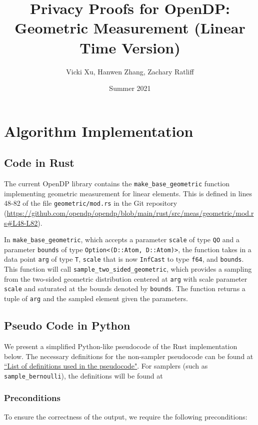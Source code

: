 \documentclass[11pt,a4paper]{article}
\title{Privacy Proofs for OpenDP: Geometric Measurement (Linear Time Version)}
\author{Vicki Xu, Hanwen Zhang, Zachary Ratliff}
\date{Summer 2021}
\newcommand{\vicki}[1]{{ {\color{olive}{(vicki)~#1}}}}
\begin{document}
\maketitle
\tableofcontents

\section{Algorithm Implementation}
\subsection{Code in Rust}
The current OpenDP library contains the \texttt{make\_base\_geometric} function implementing geometric measurement for linear elements. This is defined in lines 48-82 of the file \texttt{geometric/mod.rs} in the Git repository (\url{https://github.com/opendp/opendp/blob/main/rust/src/meas/geometric/mod.rs#L48-L82}).

\vicki{is this right?} 
In \texttt{make\_base\_geometric}, which accepts a parameter \texttt{scale} of type \texttt{QO} and a parameter \texttt{bounds} of type \texttt{Option<(D::Atom, D::Atom)>}, the function takes in a data point \texttt{arg} of type \texttt{T}, \texttt{scale} that is now \texttt{InfCast} to type \texttt{f64}, and \texttt{bounds}. This function will call \texttt{sample\_two\_sided\_geometric}, which provides a sampling from the two-sided geometric distribution centered at \texttt{arg} with scale parameter \texttt{scale} and saturated at the bounds denoted by \texttt{bounds}. The function returns a tuple of \texttt{arg} and the sampled element given the parameters. 

\subsection{Pseudo Code in Python}\label{sec:pseudocode}

We present a simplified Python-like pseudocode of the Rust implementation below. The necessary definitions for the non-sampler pseudocode can be found at \href{https://github.com/opendp/whitepapers/blob/pseudocode-defns/pseudocode-defns/pseudocode_defns.pdf}{``List of definitions used in the pseudocode"}. \vicki{fix link} For samplers (such as \texttt{sample\_bernoulli}), the definitions will be found at \vicki{insert link here}

\subsubsection*{Preconditions}
To ensure the correctness of the output, we require the following preconditions:
\end{document}
